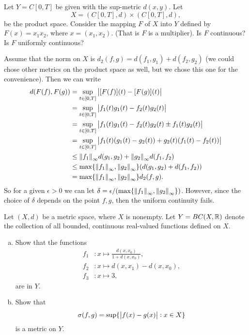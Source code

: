 \begin{problem}
	Let $ Y = C[0,T] $ be given with the sup-metric $ d(x,y) $. Let 
	\[ X = (C[0,T],d) \times (C[0,T],d), \]
	be the product space. Consider the mapping $ F $ of $ X $ into $ Y $ defined by $ F(x) = x_1x_2 $, where $ x=(x_1,x_2) $. (That is $ F $ is a multiplier). Is $ F $ continuous? Is $ F $ uniformly continuous?
\end{problem}
\begin{solution}
	Assume that the norm on $ X $ is $ d_2(f,g) = d(f_1,g_1) + d(f_2,g_2) $ (we could chose other metrics on the product space as well, but we chose this one for the convenience). Then we can write
	\begin{align*}
		d(F(f),F(g)) &= \sup_{t\in[0,T]} \left|[F(f)](t) - [F(g)](t)\right| \\
		&= \sup_{t\in[0,T]} \left|f_1(t)g_1(t) - f_2(t)g_2(t)\right| \\
		&= \sup_{t\in[0,T]} \left|f_1(t)g_1(t) - f_2(t)g_2(t) \pm f_1(t)g_2(t)\right| \\
		&= \sup_{t\in[0,T]} \left|f_1(t)(g_1(t)-g_2(t)) + g_2(t)(f_1(t)-f_2(t))\right| \\
		&\leq \norm{f_1}_\infty d(g_1,g_2) + \norm{g_2}_\infty d(f_1,f_2) \\ 
		&\leq \max\{\norm{f_1}_\infty, \norm{g_2}_\infty\} (d(g_1,g_2)+d(f_1,f_2)) \\
		&= \max\{\norm{f_1}_\infty, \norm{g_2}_\infty\} d_2(f,g).
	\end{align*}
	So for a given $ \epsilon>0 $ we can let $ \delta = \epsilon/(\max\{\norm{f_1}_\infty, \norm{g_2}_\infty\}) $. However, since the choice of $ \delta $ depends on the point $ f,g $, then the uniform continuity fails.
\end{solution}


\begin{problem}
	Let $ (X,d) $ be a metric space, where $ X $ is nonempty. Let $ Y = BC(X,\mathbb{R}) $ denote the collection of all bounded, continuous real-valued functions defined on $ X $. 
	\begin{enumerate}[(a)]
		\item Show that the functions
		\begin{align*}
			f_1 &: x\mapsto \frac{d(x,x_0)}{1+d(x,x_0)}, \\
			f_2 &: x\mapsto d(x,x_1) - d(x,x_0), \\
			f_3 &: x\mapsto 3,
		\end{align*}
		are in $ Y $.
		
		\item Show that 
		\[ \sigma(f,g) = \sup\{\left|f(x)-g(x)\right|: x\in X\} \]
		is a metric on $ Y $.
	\end{enumerate}
\end{problem}

